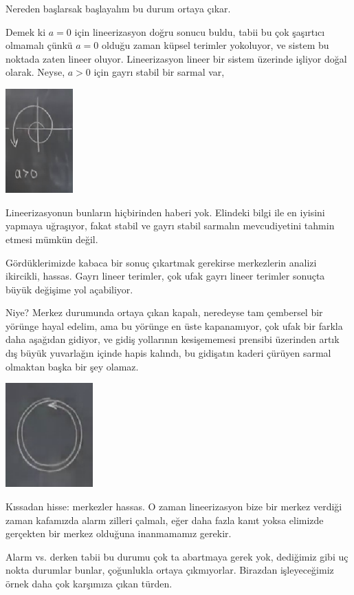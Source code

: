 \documentclass[12pt,fleqn]{article}\usepackage{../../common}
\begin{document}
Nereden başlarsak başlayalım bu durum ortaya çıkar. 

Demek ki $a=0$ için lineerizasyon doğru sonucu buldu, tabii bu çok şaşırtıcı
olmamalı çünkü $a=0$ olduğu zaman küpsel terimler yokoluyor, ve sistem bu
noktada zaten lineer oluyor. Lineerizasyon lineer bir sistem üzerinde işliyor
doğal olarak. Neyse, $a>0$ için gayrı stabil bir sarmal var,

\includegraphics[height=4cm]{06_05.png}

Lineerizasyonun bunların hiçbirinden haberi yok. Elindeki bilgi ile en iyisini
yapmaya uğraşıyor, fakat stabil ve gayrı stabil sarmalın mevcudiyetini tahmin
etmesi mümkün değil.

Gördüklerimizde kabaca bir sonuç çıkartmak gerekirse merkezlerin analizi
ikircikli, hassas. Gayrı lineer terimler, çok ufak gayrı lineer terimler sonuçta
büyük değişime yol açabiliyor.

Niye? Merkez durumunda ortaya çıkan kapalı, neredeyse tam çembersel bir yörünge
hayal edelim, ama bu yörünge en üste kapanamıyor, çok ufak bir farkla daha
aşağıdan gidiyor, ve gidiş yollarının kesişememesi prensibi üzerinden artık dış
büyük yuvarlağın içinde hapis kalındı, bu gidişatın kaderi çürüyen sarmal
olmaktan başka bir şey olamaz. 

\includegraphics[height=4cm]{06_06.png}

Kıssadan hisse: merkezler hassas. O zaman lineerizasyon bize bir merkez verdiği
zaman kafamızda alarm zilleri çalmalı, eğer daha fazla kanıt yoksa elimizde
gerçekten bir merkez olduğuna inanmamamız gerekir. 

Alarm vs. derken tabii bu durumu çok ta abartmaya gerek yok, dediğimiz gibi uç
nokta durumlar bunlar, çoğunlukla ortaya çıkmıyorlar. Birazdan işleyeceğimiz
örnek daha çok karşımıza çıkan türden.
\end{document}
